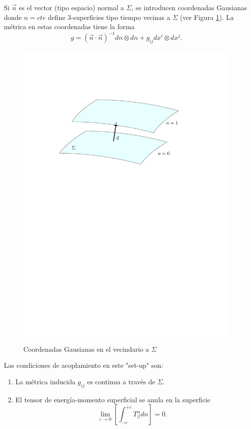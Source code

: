 Si $\vec{n}$ es el vector (tipo espacio) normal a $\Sigma$, se introducen coordenadas Gausianas donde $n=cte$ define 3-superficies tipo tiempo vecinas a $\Sigma$ (ver Figura \ref{JC}). La métrica en estas coordenadas tiene la forma 
 \begin{equation}
g=(\vec{n} \cdot \vec{n})^{-1} d n\otimes d n +g_{i j} d x^{i} \otimes d x^{j}. 
\end{equation}

 \begin{figure}[H]
     \centering
     \includegraphics[width=0.7\linewidth]{figures/Junction.pdf}
     \caption{Coordenadas Gausianas en el vecindario a $\Sigma$}
     \label{JC}
 \end{figure}
Las condiciones de acoplamiento en este "set-up" son:
 \begin{enumerate}[leftmargin=2cm]
     \item La métrica inducida $g_{ij}$ es continua a través de $\Sigma$.
     \item El tensor de energía-momento superficial se anula en la superficie
     \begin{equation}
\lim _{\varepsilon \rightarrow 0}\left[\int_{-e}^{+\varepsilon} T_{\beta}^{\alpha} d n\right]=0.
    \end{equation}
     
 \end{enumerate}
 
